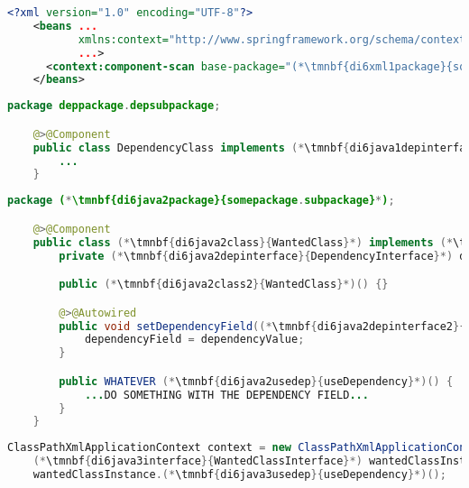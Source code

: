\label{setterinjectionautowire}
\begin{lstlisting}[language=XML, title={Configuration XML}]
    <?xml version="1.0" encoding="UTF-8"?>
    <beans ...
           xmlns:context="http://www.springframework.org/schema/context"
           ...>
      <context:component-scan base-package="(*\tmnbf{di6xml1package}{somepackage.subpackage}[ForestGreen]*)"/>
    </beans>
\end{lstlisting}
\begin{lstlisting}[language=Java, title={Dependency class}]
    package deppackage.depsubpackage;

    @>@Component
    public class DependencyClass implements (*\tmnbf{di6java1depinterface}{DependencyInterface}*) {
        ...
    }
\end{lstlisting}
\begin{lstlisting}[language=Java, title={Wanted class with the zero--parameter constructor and the setter method}]
    package (*\tmnbf{di6java2package}{somepackage.subpackage}*);

    @>@Component
    public class (*\tmnbf{di6java2class}{WantedClass}*) implements (*\tmnbf{di6java2interface}{WantedClassInterface}*) {
        private (*\tmnbf{di6java2depinterface}{DependencyInterface}*) dependencyField;

        public (*\tmnbf{di6java2class2}{WantedClass}*)() {}

        @>@Autowired
        public void setDependencyField((*\tmnbf{di6java2depinterface2}{DependencyInterface}*) dependencyValue){
            dependencyField = dependencyValue;
        }

        public WHATEVER (*\tmnbf{di6java2usedep}{useDependency}*)() {
            ...DO SOMETHING WITH THE DEPENDENCY FIELD...
        }
    }
\end{lstlisting}
\begin{lstlisting}[language=Java, title={Usage}]
    ClassPathXmlApplicationContext context = new ClassPathXmlApplicationContext("configurationFile.xml");
    (*\tmnbf{di6java3interface}{WantedClassInterface}*) wantedClassInstance = context.getBean("(*\tmnbf{di6java3beanid}{wantedClass}[ForestGreen]*)", (*\tmnbf{di6java3interface2}{WantedClassInterface}*).class);
    wantedClassInstance.(*\tmnbf{di6java3usedep}{useDependency}*)();
\end{lstlisting}
\newpage

